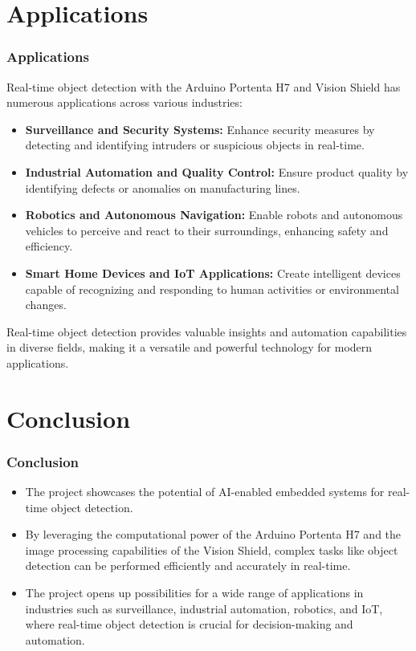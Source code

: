 \documentclass[10pt, a4paper]{beamer}
\begin{document}
	
	\section{Applications}
	\begin{frame}
		\frametitle{Applications}
		
		Real-time object detection with the Arduino Portenta H7 and Vision Shield has numerous applications across various industries:
		
		\begin{itemize}
			\item \textbf{Surveillance and Security Systems:} Enhance security measures by detecting and identifying intruders or suspicious objects in real-time.
			\item \textbf{Industrial Automation and Quality Control:} Ensure product quality by identifying defects or anomalies on manufacturing lines.
			\item \textbf{Robotics and Autonomous Navigation:} Enable robots and autonomous vehicles to perceive and react to their surroundings, enhancing safety and efficiency.
			\item \textbf{Smart Home Devices and IoT Applications:} Create intelligent devices capable of recognizing and responding to human activities or environmental changes.
		\end{itemize}
		
		Real-time object detection provides valuable insights and automation capabilities in diverse fields, making it a versatile and powerful technology for modern applications.
		
	\end{frame}
	
	
	\section{Conclusion}
	\begin{frame}
		\frametitle{Conclusion}
		
		
		\begin{itemize}
			\item The project showcases the potential of AI-enabled embedded systems for real-time object detection.
			\item By leveraging the computational power of the Arduino Portenta H7 and the image processing capabilities of the Vision Shield, complex tasks like object detection can be performed efficiently and accurately in real-time.
			\item The project opens up possibilities for a wide range of applications in industries such as surveillance, industrial automation, robotics, and IoT, where real-time object detection is crucial for decision-making and automation.
		\end{itemize}
		
	\end{frame}
	
	

	
	
\end{document}
